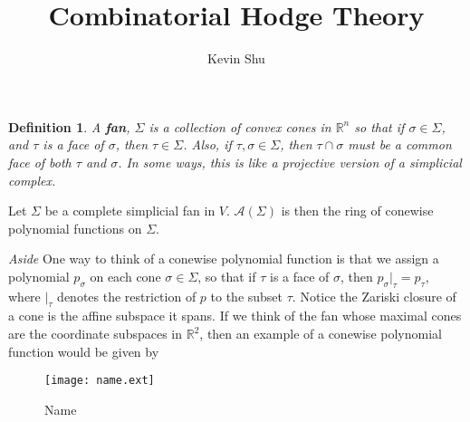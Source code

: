 \documentclass[a4paper]{article}
\author{Kevin Shu}
\title{Combinatorial Hodge Theory}
\newtheorem{def}{Definition}
\newcommand{\R}{\mathbb{R}}
\begin{document}
\maketitle
\begin{def}
    A \textbf{fan}, $\Sigma$ is a collection of convex cones in $\R^n$ so that if $\sigma \in \Sigma$, and $\tau$ is a face of $\sigma$, then $\tau \in \Sigma$. Also, if $\tau, \sigma \in \Sigma$, then $\tau \cap \sigma$ must be a common face of both $\tau$ and $\sigma$. In some ways, this is like a projective version of a simplicial complex.
\end{def}

Let $\Sigma$ be a complete simplicial fan in $V$. $\mathcal{A}(\Sigma)$ is then the ring of conewise polynomial functions on $\Sigma$. 

\textit{Aside} One way to think of a conewise polynomial function is that we assign a polynomial $p_{\sigma}$  on each cone $\sigma \in \Sigma$, so that if $\tau$ is a face of $\sigma$, then $p_{\sigma} |_{\tau} = p_{\tau}$, where $|_{\tau}$ denotes the restriction of $p$ to the subset $\tau$. Notice the Zariski closure of a cone is the affine subspace it spans. If we think of the fan whose maximal cones are the coordinate subspaces in $\R^2$, then an example of a conewise polynomial function would be given by 

\begin{figure}[htpb]
    \centering
    \texttt{[image: name.ext]}
    \caption{Name}%
    \label{fig:name}
\end{figure}
\end{document}
